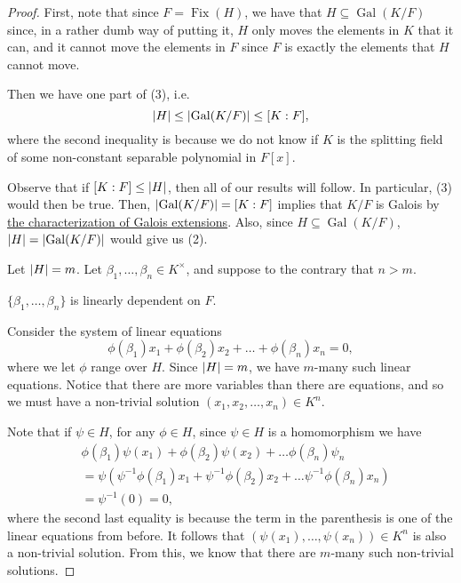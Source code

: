 \documentclass[notoc,notitlepage,nobib]{tufte-book}
\DeclareMathOperator{\Gal}{Gal}
\DeclareMathOperator{\Fix}{Fix}
\begin{document}
\begin{proof}
  First, note that since $F = \Fix(H)$, we have that $H \subseteq \Gal(K / F)$ 
  since, in a rather dumb way of putting it, $H$ only moves the elements in $K$ 
  that it can, and it cannot move the elements in $F$ since $F$ is exactly the
  elements that $H$ cannot move.

  Then we have one part of (3), i.e.
  \begin{equation*}
    \abs{H} \leq \abs{\Gal(K / F)} \leq [K : F],
  \end{equation*}
  where the second inequality is because we do not know if $K$ is the splitting
  field of some non-constant separable polynomial in $F[x]$.

  Observe that if $[K : F] \leq \left|H\right|$, then all of our results will follow.
  In particular, (3) would then be true. Then, $\abs{\Gal(K / F)} = [K : F]$
  implies that $K / F$ is Galois by
  \hyperref[thm:characterization_of_galois_extensions]{the characterization of
  Galois extensions}. Also, since $H \subseteq \Gal(K / F)$, $\abs{H} =
  \abs{\Gal(K / F)}$ would give us (2).

  Let $\left|H\right| = m$. Let $\beta_1, \ldots, \beta_n \in K^\times$, and suppose to
  the contrary that $n > m$.
  
  \noindent
   $\{\beta_1, \ldots, \beta_n\}$ is linearly dependent on $F$.

  Consider the system of linear equations
  \begin{equation*}
    \phi(\beta_1) x_1 + \phi(\beta_2) x_2 + \hdots + \phi(\beta_n) x_n = 0,
  \end{equation*}
  where we let $\phi$ range over $H$. Since $\left|H\right| = m$, we have $m$-many such
  linear equations. Notice that there are more variables than there are
  equations, and so we must have a non-trivial solution $(x_1, x_2, \ldots, x_n)
  \in K^n$.

  Note that if $\psi \in H$, for any $\phi \in H$, since $\psi \in H$ is a
  homomorphism we have
  \begin{align*}
    &\phi(\beta_1) \psi(x_1) + \phi(\beta_2) \psi(x_2) + \hdots \phi(\beta_n)
      \psi_n \\
    &= \psi\left(\psi^{-1} \phi(\beta_1) x_1 + \psi^{-1} \phi(\beta_2) x_2 +
      \hdots \psi^{-1} \phi(\beta_n) x_n\right) \\
    &= \psi^{-1}(0) = 0,
  \end{align*}
  where the second last equality is because the term in the parenthesis is one
  of the linear equations from before. It follows that $(\psi(x_1), \ldots,
  \psi(x_n)) \in K^n$ is also a non-trivial solution. From this, we know that
  there are $m$-many such non-trivial solutions.


\end{proof}
\end{document}
